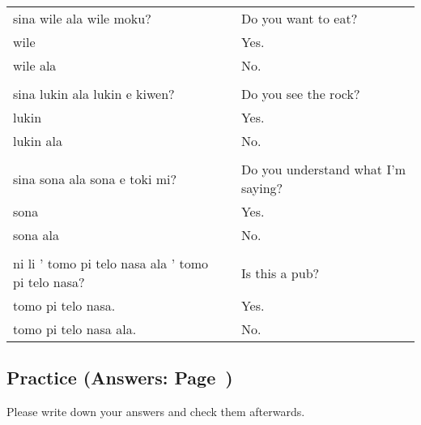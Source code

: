 \begin{supertabular}{p{5,5cm}|ll}
    sina wile ala wile moku?                           &  & Do you want to eat?                \\
    wile                                               &  & Yes.                               \\ %
    wile ala                                           &  & No.                                \\ %
                                                       &  &                                    \\ %
    sina lukin ala lukin e kiwen?                      &  & Do you see the rock?               \\
    lukin                                              &  & Yes.                               \\ %
    lukin ala                                          &  & No.                                \\ %
                                                       &  &                                    \\ %
    sina sona ala sona e toki mi?                      &  & Do you understand what I'm saying? \\
    sona                                               &  & Yes.                               \\ %
    sona ala                                           &  & No.                                \\ %
                                                       &  &                                    \\ %
    ni li ' tomo pi telo nasa ala ' tomo pi telo nasa? &  & Is this a pub?                     \\
    tomo pi telo nasa.                                 &  & Yes.                               \\  %
    tomo pi telo nasa ala.                             &  & No.                                \\ %
\end{supertabular}

%
%
\newpage
%
\subsection*{Practice (Answers: Page~\pageref{'negation_yes_no_questions'})}
%
Please write down your answers and check them afterwards.

